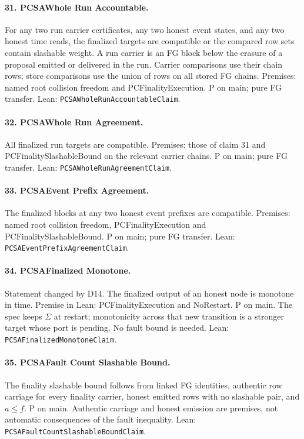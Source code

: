 \documentclass{article}
\newcommand{\nm}[1]{\nolinkurl{#1}}
\begin{document}
\paragraph{31. PCSAWhole Run Accountable.}
For any two run carrier certificates, any two honest event states, and any two honest time reads, the finalized targets are compatible or the compared row sets contain slashable weight. A run carrier is an FG block below the erasure of a proposal emitted or delivered in the run. Carrier comparisons use their chain rows; store comparisons use the union of rows on all stored FG chains. Premises: named root collision freedom and PCFinalityExecution. P on main; pure FG transfer.
Lean: \nm{PCSAWholeRunAccountableClaim}.

\paragraph{32. PCSAWhole Run Agreement.}
All finalized run targets are compatible. Premises: those of claim 31 and PCFinalitySlashableBound on the relevant carrier chains. P on main; pure FG transfer.
Lean: \nm{PCSAWholeRunAgreementClaim}.

\paragraph{33. PCSAEvent Prefix Agreement.}
The finalized blocks at any two honest event prefixes are compatible. Premises: named root collision freedom, PCFinalityExecution and PCFinalitySlashableBound. P on main; pure FG transfer.
Lean: \nm{PCSAEventPrefixAgreementClaim}.

\paragraph{34. PCSAFinalized Monotone.}
Statement changed by D14.
The finalized output of an honest node is monotone in time. Premise in Lean: PCFinalityExecution and NoRestart. P on main. The spec keeps $\Sigma$ at restart; monotonicity across that new transition is a stronger target whose port is pending. No fault bound is needed.
Lean: \nm{PCSAFinalizedMonotoneClaim}.

\paragraph{35. PCSAFault Count Slashable Bound.}
The finality slashable bound follows from linked FG identities, authentic row carriage for every finality carrier, honest emitted rows with no slashable pair, and $a\leq f$. P on main. Authentic carriage and honest emission are premises, not automatic consequences of the fault inequality.
Lean: \nm{PCSAFaultCountSlashableBoundClaim}.
\end{document}
